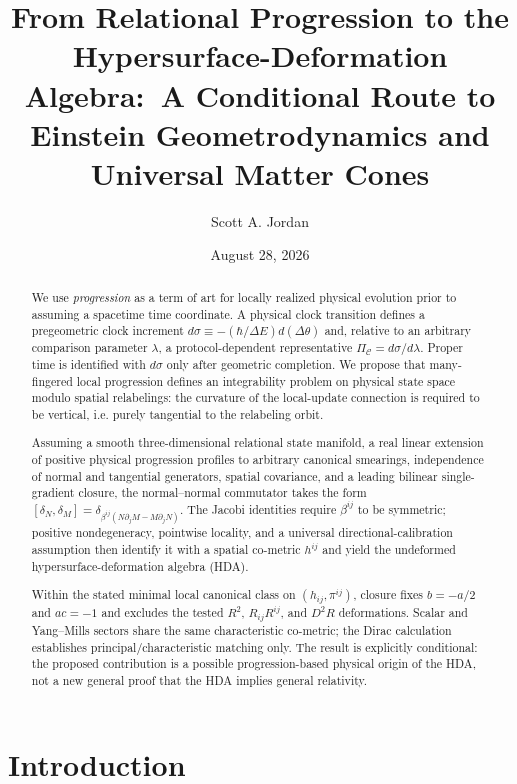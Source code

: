 \documentclass[11pt]{article}
\title{\textbf{From Relational Progression to the Hypersurface-Deformation Algebra:\
A Conditional Route to Einstein Geometrodynamics and Universal Matter Cones}}
\author{Scott A. Jordan}
\date{August 28, 2026}
\begin{document}
\maketitle

\begin{abstract}
We use \emph{progression} as a term of art for locally realized physical evolution prior to assuming a spacetime time coordinate. A physical clock transition defines a pregeometric clock increment $d\sigma\equiv-(\hbar/\Delta E)d(\Delta\theta)$ and, relative to an arbitrary comparison parameter $\lambda$, a protocol-dependent representative $\Pi_{\mathcal C}=d\sigma/d\lambda$. Proper time is identified with $d\sigma$ only after geometric completion. We propose that many-fingered local progression defines an integrability problem on physical state space modulo spatial relabelings: the curvature of the local-update connection is required to be vertical, i.e. purely tangential to the relabeling orbit.

Assuming a smooth three-dimensional relational state manifold, a real linear extension of positive physical progression profiles to arbitrary canonical smearings, independence of normal and tangential generators, spatial covariance, and a leading bilinear single-gradient closure, the normal--normal commutator takes the form $[\delta_N,\delta_M]=\delta_{\beta^{ij}(N\partial_jM-M\partial_jN)}$. The Jacobi identities require $\beta^{ij}$ to be symmetric; positive nondegeneracy, pointwise locality, and a universal directional-calibration assumption then identify it with a spatial co-metric $h^{ij}$ and yield the undeformed hypersurface-deformation algebra (HDA).

Within the stated minimal local canonical class on $(h_{ij},\pi^{ij})$, closure fixes $b=-a/2$ and $ac=-1$ and excludes the tested $R^2$, $R_{ij}R^{ij}$, and $D^2R$ deformations. Scalar and Yang--Mills sectors share the same characteristic co-metric; the Dirac calculation establishes principal/characteristic matching only. The result is explicitly conditional: the proposed contribution is a possible progression-based physical origin of the HDA, not a new general proof that the HDA implies general relativity.\end{abstract}

\section{Introduction}
\end{document}
